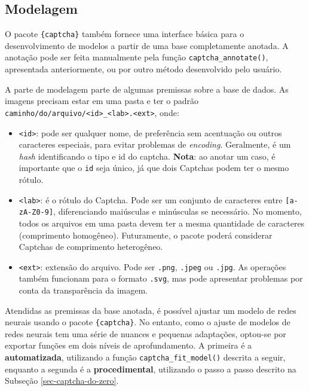 \documentclass[12pt,twoside,brazilian]{book}
\providecommand{\tightlist}{%
  \setlength{\itemsep}{0pt}\setlength{\parskip}{0pt}}
\begin{document}
\hypertarget{sec-ap-modelagem}{%
\subsection{Modelagem}\label{sec-ap-modelagem}}

O pacote \texttt{\{captcha\}} também fornece uma interface básica para o
desenvolvimento de modelos a partir de uma base completamente anotada. A
anotação pode ser feita manualmente pela função
\texttt{captcha\_annotate()}, apresentada anteriormente, ou por outro
método desenvolvido pelo usuário.

A parte de modelagem parte de algumas premissas sobre a base de dados.
As imagens precisam estar em uma pasta e ter o padrão
\texttt{caminho/do/arquivo/\textless{}id\textgreater{}\_\textless{}lab\textgreater{}.\textless{}ext\textgreater{}},
onde:

\begin{itemize}
\tightlist
\item
  \texttt{\textless{}id\textgreater{}}: pode ser qualquer nome, de
  preferência sem acentuação ou outros caracteres especiais, para evitar
  problemas de \emph{encoding}. Geralmente, é um \emph{hash}
  identificando o tipo e id do captcha. \textbf{Nota}: ao anotar um
  caso, é importante que o \texttt{id} seja único, já que dois Captchas
  podem ter o mesmo rótulo.
\item
  \texttt{\textless{}lab\textgreater{}}: é o rótulo do Captcha. Pode ser
  um conjunto de caracteres entre \texttt{{[}a-zA-Z0-9{]}},
  diferenciando maiúsculas e minúsculas se necessário. No momento, todos
  os arquivos em uma pasta devem ter a mesma quantidade de caracteres
  (comprimento homogêneo). Futuramente, o pacote poderá considerar
  Captchas de comprimento heterogêneo.
\item
  \texttt{\textless{}ext\textgreater{}}: extensão do arquivo. Pode ser
  \texttt{.png}, \texttt{.jpeg} ou \texttt{.jpg}. As operações também
  funcionam para o formato \texttt{.svg}, mas pode apresentar problemas
  por conta da transparência da imagem.
\end{itemize}

Atendidas as premissas da base anotada, é possível ajustar um modelo de
redes neurais usando o pacote \texttt{\{captcha\}}. No entanto, como o
ajuste de modelos de redes neurais tem uma série de nuances e pequenas
adaptações, optou-se por exportar funções em dois níveis de
aprofundamento. A primeira é a \textbf{automatizada}, utilizando a
função \texttt{captcha\_fit\_model()} descrita a seguir, enquanto a
segunda é a \textbf{procedimental}, utilizando o passo a passo descrito
na Subseção \ref{sec-captcha-do-zero}.
\end{document}
